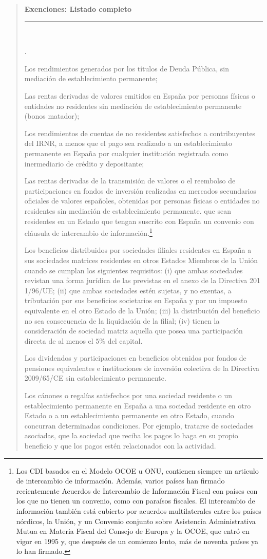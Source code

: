 \documentclass[10pt,a4paper]{article}
\newcounter{numitem}
\newenvironment{lnum}
      {\begin{list}{\arabic{numitem}.}{%
          \usecounter{numitem}%
          \setlength{\leftmargin}{1cm}%
          \setlength{\parskip}{3pt}%
          \setlength{\itemsep}{0pt}%
          \setlength{\parsep}{0pt}%
      }}
      {\end{list}}
\newenvironment{specialblock}[1]{%
      \begin{quote} %
      \small %
      \noindent\textbf{#1}\\[-0.3em] %
      \rule{\linewidth}{0.4pt}\\[0.6em]}{
      \end{quote}}
\newcounter{anexo}
\begin{document}
\begin{specialblock}{\textbf{Exenciones:} Listado completo}
\begin{lnum}
        \item Los rendimientos generados por los títulos de Deuda Pública, sin mediación de establecimiento permanente;
        \item Las rentas derivadas de valores emitidos en España por personas físicas o entidades no residentes sin mediación de establecimiento permanente (bonos matador);
        \item Los rendimientos de cuentas de no residentes satisfechos a contribuyentes del IRNR, a menos que el pago sea realizado a un establecimiento permanente en España por cualquier institución registrada como inermediario de crédito y depositante;
        \item Las rentas derivadas de la transmisión de valores o el reembolso de participaciones en fondos de inversión realizadas en mercados secundarios oficiales de valores españoles, obtenidas por personas físicas o entidades no residentes sin mediación de establecimiento permanente. que sean residentes en un Estado que tengan suscrito con España un convenio con cláusula de intercambio de información.\footnote{%
            Los CDI basados en el Modelo OCOE u ONU, contienen siempre un articulo de intercambio de información. Además, varios países han firmado recientemente Acuerdos de Intercambio de Información Fiscal con países con los que no tienen un convenio, como con paraísos fiscales. El intercambio de información también está cubierto por acuerdos multilaterales entre los países nórdicos, la Unión, y un Convenio conjunto sobre Asistencia Administrativa Mutua en Materia Fiscal del Consejo de Europa y la OCOE, que entró en vigor en 1995 y, que después de un comienzo lento, más de noventa países ya lo han firmado.
        }
        \item Los beneficios distribuidos por sociedades filiales residentes en España a sus sociedades matrices residentes en otros Estados Miembros de la Unión cuando se cumplan los siguientes requisitos: (i) que ambas sociedades revistan una forma jurídica de las previstas en el anexo de la Directiva 201 1/96/UE; (ii) que ambas sociedades estén sujetas, y no exentas, a tributación por sus beneficios societarios en España y por un impuesto equivalente en el otro Estado de la Unión; (iii) la distribución del beneficio no sea consecuencia de la liquidación de la filial; (iv) tienen la consideración de sociedad matriz aquella que posea una participación directa de al menos el $5\%$ del capital. 
        \item Los dividendos y participaciones en beneficios obtenidos por fondos de pensiones equivalentes e instituciones de inversión colectiva de la Directiva 2009/65/CE sin establecimiento permanente.
        \item Los cánones o regalías satisfechos por una sociedad residente o un establecimiento permanente en España a una sociedad residente en otro Estado o a un establecimiento permanente en otro Estado, cuando concurran determinadas condiciones. Por ejemplo, tratarse de sociedades asociadas, que la sociedad que reciba los pagos lo haga en su propio beneficio y que los pagos estén relacionados con la actividad.
    \end{lnum}


\end{specialblock}
\end{document}
